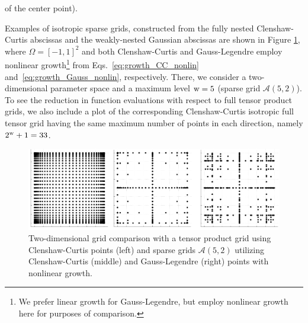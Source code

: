 of the center point).

Examples of isotropic sparse grids, constructed from the fully nested 
Clenshaw-Curtis abscissas %
and the weakly-nested Gaussian abscissas %
are shown in Figure \ref{fig:isogrid_N2_q7}, where $\Omega=[-1,1]^2$
and both Clenshaw-Curtis and Gauss-Legendre employ nonlinear
growth\footnote{We prefer linear growth for Gauss-Legendre, but employ
nonlinear growth here for purposes of comparison.} from
Eqs.~\ref{eq:growth_CC_nonlin} and~\ref{eq:growth_Gauss_nonlin},
respectively.  There, we consider a two-dimensional parameter space
and a maximum level ${\rm w}=5$ (sparse grid $\mathscr{A}(5,2)$).  To
see the reduction in function evaluations with respect to full tensor
product grids, we also include a plot of the corresponding
Clenshaw-Curtis isotropic full tensor grid having the same maximum
number of points in each direction, namely $2^{\rm w}+1 = 33$.
%
\begin{figure}[h!]
\begin{center}
\includegraphics[width=6.5in]{images/isogrid_N2_q6}
\caption{Two-dimensional grid comparison with a tensor product grid
  using Clenshaw-Curtis points (left) and sparse grids
  $\mathscr{A}(5,2)$ utilizing Clenshaw-Curtis (middle) and
  Gauss-Legendre (right) points with nonlinear growth. }
\label{fig:isogrid_N2_q7}
\end{center}
\end{figure}

